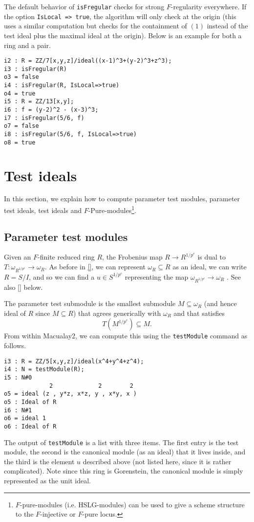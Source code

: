 \documentclass[11pt]{amsart}
\begin{document}
The default behavior of {\tt isFregular} checks for strong $F$-regularity everywhere. If the option {\tt IsLocal => true}, the algorithm will only check at the origin (this uses a similar computation but checks for the containment of $(1)$ instead of the test ideal plus the maximal ideal at the origin). Below is an example for both a ring and a pair.

\begin{verbatim}
i2 : R = ZZ/7[x,y,z]/ideal((x-1)^3+(y-2)^3+z^3);
i3 : isFregular(R)
o3 = false
i4 : isFregular(R, IsLocal=>true)
o4 = true
i5 : R = ZZ/13[x,y];
i6 : f = (y-2)^2 - (x-3)^3;
i7 : isFregular(5/6, f)
o7 = false
i8 : isFregular(5/6, f, IsLocal=>true)
o8 = true
\end{verbatim}


\section{Test ideals}

In this section, we explain how to compute parameter test modules, parameter test ideals, test ideals and $F$-Pure-modules\footnote{$F$-pure-modules (i.e. HSLG-modules) can be used to give a scheme structure to the $F$-injective or $F$-pure locus.}.

\subsection{Parameter test modules}

Given an $F$-finite reduced ring $R$, the Frobenius map $R \to R^{1/p^e}$ is dual to $T : \omega_{R^{1/p^e}} \to \omega_R$.  As before in \autoref{}, we can represent $\omega_R \subseteq R$ as an ideal, we can write $R = S/I$, and so we can find a $u \in S^{1/p^e}$ representing the map $\omega_{R^{1/p^e}} \to \omega_R$ \cite{}.  See also \autoref{} below.

The parameter test submodule is the smallest submodule $M \subseteq \omega_R$ (and hence ideal of $R$ since $M \subseteq R$) that agrees generically with $\omega_R$ and that satisfies
\[
T (M^{1/p^e}) \subseteq M.
\]
From within Macualay2, we can compute this using the {\tt testModule} command as follows.
\begin{verbatim}
i3 : R = ZZ/5[x,y,z]/ideal(x^4+y^4+z^4);
i4 : N = testModule(R);
i5 : N#0
             2             2        2
o5 = ideal (z , y*z, x*z, y , x*y, x )
o5 : Ideal of R
i6 : N#1
o6 = ideal 1
o6 : Ideal of R
\end{verbatim}
The output of {\tt testModule} is a list with three items.  The first entry is the test module, the second is the canonical module (as an ideal) that it lives inside, and the third is the element $u$ described above (not listed here, since it is rather complicated).  Note since this ring is Gorenstein, the canonical module is simply represented as the unit ideal.
\end{document}

